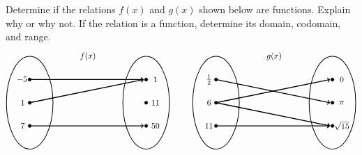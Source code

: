 \documentclass[11pt,letterpaper]{article}
\begin{document}

 Determine if the relations $f(x)$ and $g(x)$ shown below are functions. Explain why or why not. If the relation is a function, determine its domain, codomain, and range. 
	\[
	\begin{tikzpicture}
	\node at (2.5,2) {$f(x)$};
	\draw[line width=0.03cm] (0,0) circle (1 and 2);
	\draw[line width=0.03cm] (5,0) circle (1 and 2);
	
	\draw[fill=black] (0,1) circle (0.07);
	\draw[fill=black] (0,0) circle (0.07);
	\draw[fill=black] (0,-1) circle (0.07);
	
	\draw[fill=black] (5,1) circle (0.07);
	\draw[fill=black] (5,0) circle (0.07);
	\draw[fill=black] (5,-1) circle (0.07);
	
	\draw[line width=0.04cm,->] (0,1) -- (4.9,1);
	\draw[line width=0.04cm,->] (0,0) -- (4.9,1);
	\draw[line width=0.04cm,->] (0,-1) -- (4.9,-1);
	
	\node at (-0.3,1) {$\!-5$};
	\node at (-0.3,0) {$1$};
	\node at (-0.3,-1) {$7$};
	
	\node at (5.4,1) {$1$};
	\node at (5.4,0) {$11$};
	\node at (5.4,-1) {$50$};
	
	\tikzset{shift={(8,0)}}
	\node at (2.5,2) {$g(x)$};
	\draw[line width=0.03cm] (0,0) circle (1 and 2);
	\draw[line width=0.03cm] (5,0) circle (1 and 2);
	
	\draw[fill=black] (0,1) circle (0.07);
	\draw[fill=black] (0,0) circle (0.07);
	\draw[fill=black] (0,-1) circle (0.07);
	
	\draw[fill=black] (5,1) circle (0.07);
	\draw[fill=black] (5,0) circle (0.07);
	\draw[fill=black] (5,-1) circle (0.07);
	
	\draw[line width=0.04cm,->] (0,1) -- (4.9,0);
	\draw[line width=0.04cm,->] (0,0) -- (4.9,1);
	\draw[line width=0.04cm,->] (0,0) -- (4.9,-1);
	\draw[line width=0.04cm,->] (0,-1) -- (4.9,-1);
	
	\node at (-0.3,1) {$\frac{1}{2}$};
	\node at (-0.3,0) {$6$};
	\node at (-0.3,-1) {$11$};
	
	\node at (5.4,1) {$0$};
	\node at (5.4,0) {$\pi$};
	\node at (5.4,-1) {$\sqrt{15}$};
	\end{tikzpicture}
	\] \pspace
\end{document}
